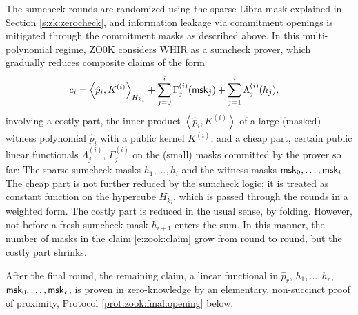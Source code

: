 The sumcheck rounds are randomized using the sparse Libra mask explained in Section \ref{s:zk:zerocheck}, and information leakage via commitment openings is mitigated through the commitment masks as described above.
In this multi-polynomial regime, ZO0K considers WHIR as a sumcheck prover, which gradually reduces composite claims of the form 
\begin{align}
\label{e:zook:claim}
c_{i}  &= \left\langle \hat p_{i}, K^{(i)} \right\rangle_{H_{k_{i}}} 
+ \sum_{j=0}^{i} \Gamma_j^{(i)}(\mathsf{msk}_j) + \sum_{j=1}^{i} \Lambda_{j}^{(i)} (h_{j}),
\end{align}
involving a costly part, the inner product $\left\langle \hat p_{i}, K^{(i)} \right\rangle$ of a large (masked) witness polynomial $\hat p_i$ with a public kernel $K^{(i)}$, and a cheap part, certain public linear functionals $\Lambda_j^{(i)}$, $\Gamma_j^{(i)}$ on the (small) masks committed by the prover so far:\footnotemark
{}
The sparse sumcheck masks $h_1,\ldots, h_i$ and the witness masks $\mathsf{msk}_0,\ldots,\mathsf{msk}_i$.
The cheap part is not further reduced by the sumcheck logic; it is treated as constant function 
on the hypercube $H_{k_i}$, which is passed through the rounds in a weighted form.
The costly part is reduced in the usual sense, by folding. 
However, not before a fresh sumcheck mask $h_{i+1}$ enters the sum.
In this manner, the number of masks in the claim \eqref{e:zook:claim} grow from round to round, but the costly part shrinks.

After the final round, the remaining claim, a linear functional in $\hat p_r$, $h_1,\ldots, h_r$, $\mathsf{msk}_0,\ldots, \mathsf{msk}_{r}$, is proven in zero-knowledge by an elementary, non-succinct proof of proximity, Protocol \ref{prot:zook:final:opening} below.





